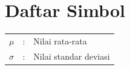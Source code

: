 \chapter*{Daftar Simbol}

\begin{table}[htbp]
    \begin{tabular}{lcl}
        $\mu$ & : & Nilai rata-rata\\
        $\sigma$ & : & Nilai standar deviasi\\
    \end{tabular}
\end{table}